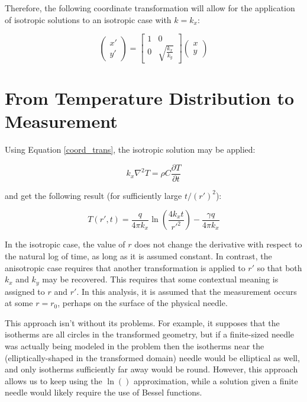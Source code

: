 Therefore, the following coordinate transformation will allow for the application
of isotropic solutions to an isotropic case with \(k = k_x\):

\begin{equation}
    \label{coord_trans}
    \begin{pmatrix}x' \\ y'\end{pmatrix} =
    \begin{bmatrix}1 & 0\\ 0 & \sqrt{\frac{k_x}{k_y}} \end{bmatrix}\begin{pmatrix}x \\ y\end{pmatrix}
\end{equation}

\section{From Temperature Distribution to Measurement}

Using Equation \ref{coord_trans}, the isotropic solution may be applied:

\begin{equation}
    k_x \nabla^2 T = \rho C\frac{\partial T}{\partial t}
\end{equation}

and get the following result (for sufficiently large \(t/(r')^2\)):

\begin{equation}
T(r',t) = \frac{q}{4\pi k_x}\ln\left(\frac{4k_xt}{r'^2}\right) - \frac{\gamma q}{4\pi k_x}
\end{equation}

In the isotropic case, the value of \(r\) does not change the derivative with
respect to the natural log of time, as long as it is assumed constant. In contrast, the anisotropic case requires that another transformation is applied
to \(r'\) so that both \(k_x\) and \(k_y\) may be recovered. This requires that
some contextual meaning is assigned to \(r\) and \(r'\). In this analysis, it
is assumed that the measurement occurs at some  \(r = r_{\textrm{0}}\), perhaps
on the surface of the physical needle.

This approach isn't without its problems. For example, it supposes that the
isotherms are all circles in the transformed geometry, but if a finite-sized
needle was actually being modeled in the problem then the isotherms near the
(elliptically-shaped in the transformed domain) needle would be elliptical as
well, and only isotherms sufficiently far away would be round. However, this
approach allows us to keep using the \(\ln()\) approximation, while a solution
given a finite needle would likely require the use of Bessel functions.

